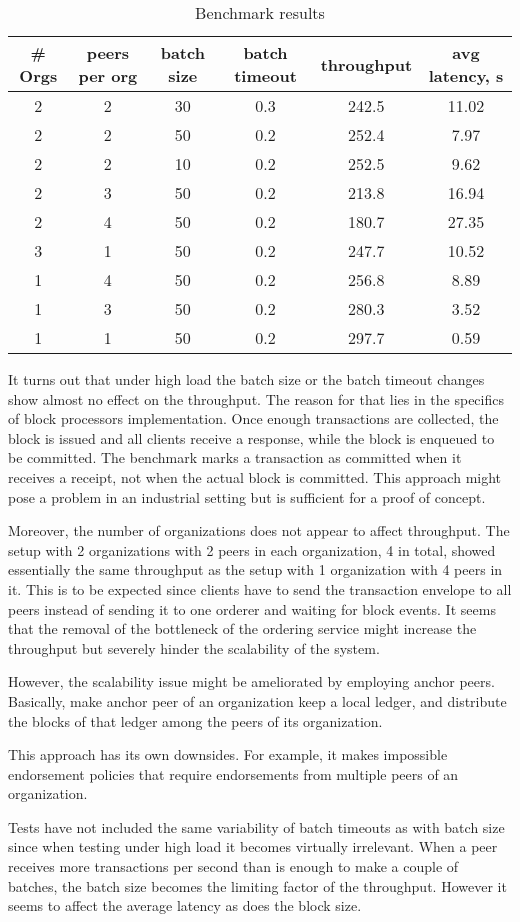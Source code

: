 \begin{table}[h!]
\begin{center}
\begin{tabular}{ c|c|c|c|c|c }
  \# Orgs & peers per org & batch size & batch timeout & throughput & avg latency, s \\
 \hline
 \hline
 2 & 2 & 30 & 0.3 & 242.5 & 11.02\\
 \hline
 2 & 2 & 50 & 0.2 & 252.4 & 7.97 \\
 \hline
 2 & 2 & 10 & 0.2 & 252.5 & 9.62 \\
 \hline
 2 & 3 & 50 & 0.2 & 213.8 & 16.94 \\
 \hline
 2 & 4 & 50 & 0.2 & 180.7 & 27.35 \\
 \hline
 3 & 1 & 50 & 0.2 & 247.7 & 10.52 \\
 \hline
 1 & 4 & 50 & 0.2 & 256.8 & 8.89 \\
 \hline
 1 & 3 & 50 & 0.2 & 280.3 & 3.52 \\
 \hline
 1 & 1 & 50 & 0.2 & 297.7 & 0.59 \\
 \hline
\end{tabular}
\end{center}
\caption{Benchmark results}
\label{table:results}
\end{table}

It turns out that under high load the batch size or the batch timeout changes show almost no effect on the throughput. The reason for that lies in the specifics of block processors implementation. Once enough transactions are collected, the block is issued and all clients receive a response, while the block is enqueued to be committed. The benchmark marks a transaction as committed when it receives a receipt, not when the actual block is committed. This approach might pose a problem in an industrial setting but is sufficient for a proof of concept.

Moreover, the number of organizations does not appear to affect throughput. The setup with 2 organizations with 2 peers in each organization, 4 in total, showed essentially the same throughput as the setup with 1 organization with 4 peers in it. This is to be expected since clients have to send the transaction envelope to all peers instead of sending it to one orderer and waiting for block events. It seems that the removal of the bottleneck of the ordering service might increase the throughput but severely hinder the scalability of the system.

However, the scalability issue might be ameliorated by employing anchor peers. Basically, make anchor peer of an organization keep a local ledger, and distribute the blocks of that ledger among the peers of its organization.

This approach has its own downsides. For example, it makes impossible endorsement policies that require endorsements from multiple peers of an organization.

Tests have not included the same variability of batch timeouts as with batch size since when testing under high load it becomes virtually irrelevant. When a peer receives more transactions per second than is enough to make a couple of batches, the batch size becomes the limiting factor of the throughput. However it seems to affect the average latency as does the block size.
